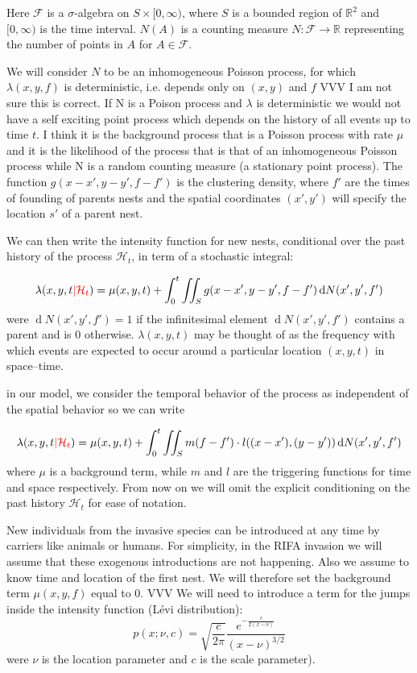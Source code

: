 \documentclass[11pt,a4paper]{article}
\renewcommand{\d}[1]{\ensuremath{\operatorname{d}\!{#1}}}
\begin{document}
Here $\mathcal{F}$ is a $\sigma$-algebra on $S \times [0, \infty )$, where $S$ is a bounded region of $\mathbb{R}^2$ and $[0, \infty)$ is the time interval. $N(A)$ is a counting measure $N: \mathcal{F} \to \mathbb{R}$ representing the number of points in $A$ for $A \in \mathcal{F}$.

We will consider $N$ to be an inhomogeneous Poisson process, for which $\lambda(x, y, f)$ is deterministic, i.e. depends only on $(x, y)$ and $f$ \cite{Shoenberg} {\color{red}VVV I am not sure this is correct. If N is a Poison process and $\lambda$ is deterministic we would not have a self exciting point process which depends on the history of all events up to time $t$. I think it is the background process that is a Poisson process with rate $\mu$ and it is the likelihood of the process that is that of an inhomogeneous Poisson process while N is a random counting measure (a stationary point process)}. The function $g(x - x', y - y', f - f')$ is the clustering density, where $f'$ are the times of founding of parents nests and the spatial coordinates $(x', y')$ will specify the location $s'$ of a parent nest.

We can then write the intensity function for new nests, {\color{red} conditional over the past history of the process $\mathcal{H}_t$}, in term of a stochastic integral:

\[
\lambda(x, y, t {\color{red}| \mathcal{H}_t}) = \mu(x, y, t) + \int_{0}^{t} \iint_{S} g(x - x', y - y', f - f') \d N(x', y', f')
\]
were $\d N(x', y', f') = 1$ if the infinitesimal element $\d N(x', y', f')$ contains a parent and is 0 otherwise. $\lambda(x, y, t)$ may be thought of as the frequency with which events are expected to occur around a particular location $(x, y, t)$ in space–time.

in our model, we consider the temporal behavior of the process as independent of the spatial behavior so we can write

\[
\lambda(x, y, t {\color{red}| \mathcal{H}_t}) = \mu(x, y, t) + \int_{0}^{t} \iint_{S} m(f-f') \cdot l((x - x'), (y - y')) \d N(x', y', f')
\]
where $\mu$ is a background term, while $m$ and $l$ are the triggering functions for time and space respectively. {\color{red} From now on we will omit the explicit conditioning on the past history $\mathcal{H}_t$ for ease of notation.}

New individuals from the invasive species can be introduced at any time by carriers like animals or humans. For simplicity, in the RIFA invasion we will assume that these exogenous introductions are not happening. Also we assume to know time and location of the first nest.  We will therefore set the background term $\mu(x, y, f) $ equal to 0. {\color{red} VVV We will need to introduce a term for the jumps inside the intensity function (L\'evi distribution):
\begin{equation*}
  p(x; \nu, c ) = \sqrt{\frac{c}{2\pi}} \frac{e^{-\frac{c}{2(x-\nu)}}}{(x - \nu)^{3/2}}  
\end{equation*}
were $\nu$ is the location parameter and $c$ is the scale parameter).}
\end{document}
